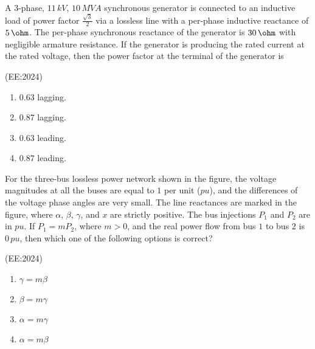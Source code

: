     \iffalse
\title{EE:2024}
\author{AI24BTECH11007}
\section{ee}
\chapter{2024}
\fi
                            
    \item A 3-phase, $11\, kV$, $10\, MVA$ synchronous generator is connected to an inductive load of power factor $\frac{\sqrt{3}}{2}$ via a lossless line with a per-phase inductive reactance of $5 \,\ohm$. The per-phase synchronous reactance of the generator is $30\, \ohm$ with negligible armature resistance. If the generator is producing the rated current at the rated voltage, then the power factor at the terminal of the generator is
	   
	    \hfill{(EE:2024)}
		\begin{multicols}{4}
    \begin{enumerate}
        \item $0.63$ lagging.
        \item $0.87$ lagging.
        \item $0.63$ leading.
        \item $0.87$ leading.
    \end{enumerate}
\end{multicols}
    \item For the three-bus lossless power network shown in the figure, the voltage magnitudes at all the buses are equal to $1$ per unit ($pu$), and the differences of the voltage phase angles are very small. The line reactances are marked in the figure, where $\alpha$, $\beta$, $\gamma$, and $x$ are strictly positive. The bus injections $P_1$ and $P_2$ are in $pu$. If $P_1 = mP_2$, where $m > 0$, and the real power flow from bus $1$ to bus $2$ is $0\, pu$, then which one of the following options is correct?

	    
	    \hfill{(EE:2024)}
		\begin{multicols}{4}
    \begin{enumerate}
        \item $\gamma = m\beta$
        \item $\beta = m\gamma$
        \item $\alpha = m\gamma$
        \item $\alpha = m\beta$
    \end{enumerate}
			\end{multicols}

